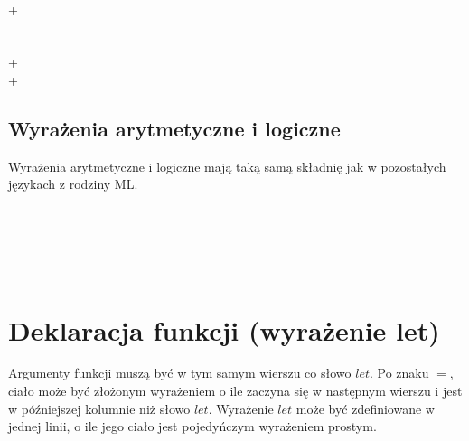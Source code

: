 \documentclass[declaration,shortabstract]{iithesis}
\begin{document}
\begin{bnf*}
    {     
       
    }\\
    {     
      + \ast {}
    }\\
    {  \bnfor \bnfes}\\
    {    \bnfor \bnfes}\\
    { + \bnfor {} 
     \bnfor \bnfes}\\
    { + \bnfor {} 
     \bnfor \bnfes}\\
    {}
\end{bnf*}

\subsection{Wyrażenia arytmetyczne i logiczne}
Wyrażenia arytmetyczne i logiczne mają taką samą składnię jak w pozostałych
językach z rodziny ML.
\begin{bnf*}
    {    
    }\\
    {    
    }\\
    { \bnfts{+} \bnfor \bnfts{-} \bnfor \bnfts{*}
      \bnfor \bnfts{/} 
    }\\
    { \bnfts{\&\&} \bnfor \bnfts{$\|$} 
    }\\
\end{bnf*}

\section{Deklaracja funkcji (wyrażenie let)}

Argumenty funkcji muszą być w tym samym wierszu co słowo $let$. Po znaku 
$=$, ciało może być złożonym wyrażeniem o ile zaczyna się w następnym wierszu i 
jest w późniejszej kolumnie niż słowo $let$. Wyrażenie $let$ może być 
zdefiniowane w jednej linii, o ile jego ciało jest pojedyńczym wyrażeniem prostym.
\end{document}
